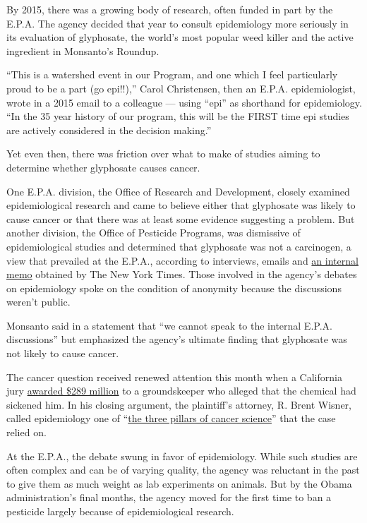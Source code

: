 By 2015, there was a growing body of research, often funded in part by
the E.P.A. The agency decided that year to consult epidemiology more
seriously in its evaluation of glyphosate, the world's most popular weed
killer and the active ingredient in Monsanto's Roundup.

``This is a watershed event in our Program, and one which I feel
particularly proud to be a part (go epi!!),'' Carol Christensen, then an
E.P.A. epidemiologist, wrote in a 2015 email to a colleague --- using
``epi'' as shorthand for epidemiology. ``In the 35 year history of our
program, this will be the FIRST time epi studies are actively considered
in the decision making.''

Yet even then, there was friction over what to make of studies aiming to
determine whether glyphosate causes cancer.

One E.P.A. division, the Office of Research and Development, closely
examined epidemiological research and came to believe either that
glyphosate was likely to cause cancer or that there was at least some
evidence suggesting a problem. But another division, the Office of
Pesticide Programs, was dismissive of epidemiological studies and
determined that glyphosate was not a carcinogen, a view that prevailed
at the E.P.A., according to interviews, emails and
\href{https://www.documentcloud.org/documents/4641115-Cogliano-Memo.html}{an
internal memo} obtained by The New York Times. Those involved in the
agency's debates on epidemiology spoke on the condition of anonymity
because the discussions weren't public.

Monsanto said in a statement that ``we cannot speak to the internal
E.P.A. discussions'' but emphasized the agency's ultimate finding that
glyphosate was not likely to cause cancer.

The cancer question received renewed attention this month when a
California jury
\href{https://www.nbcnews.com/news/us-news/jury-orders-monsanto-pay-290m-roundup-trial-n899811}{awarded
\$289 million} to a groundskeeper who alleged that the chemical had
sickened him. In his closing argument, the plaintiff's attorney, R.
Brent Wisner, called epidemiology one of
``\href{https://www.baumhedlundlaw.com/pdf/monsanto-documents/johnson-trial/Johnson-Day-Eighteen-A-8-7-18.pdf}{the
three pillars of cancer science}'' that the case relied on.

At the E.P.A., the debate swung in favor of epidemiology. While such
studies are often complex and can be of varying quality, the agency was
reluctant in the past to give them as much weight as lab experiments on
animals. But by the Obama administration's final months, the agency
moved for the first time to ban a pesticide largely because of
epidemiological research.

